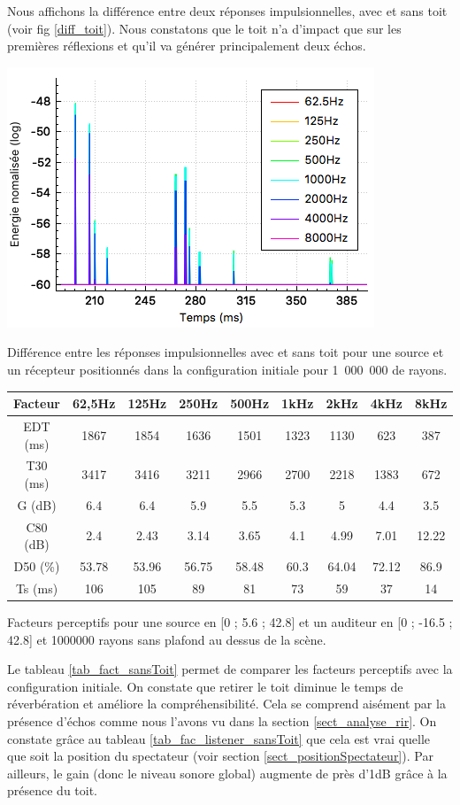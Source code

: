Nous affichons la différence entre deux réponses impulsionnelles, avec et sans toit (voir fig \ref{diff_toit}). Nous constatons que le toit n'a d'impact que sur les premières réflexions et qu'il va générer principalement deux échos.
%
\begin{figureth}
	\includegraphics[width=0.6\linewidth]{images/diff_toit}
	\caption{Différence entre les réponses impulsionnelles avec et sans toit pour une source et un récepteur positionnés dans la configuration initiale pour 1~000~000 de rayons.}
	\label{diff_toit}
\end{figureth}
%
\begin{tableth}
 \begin{tabular}{| *{9}{c|}} 
 \hline 
 Facteur & 62,5Hz & 125Hz & 250Hz & 500Hz & 1kHz & 2kHz & 4kHz & 8kHz \\ 
 \hline 
 \hline 
\gls{EDT} (ms)& 1867& 1854& 1636& 1501& 1323& 1130& 623& 387 \\ 
 \hline 
\gls{T30} (ms)& 3417& 3416& 3211& 2966& 2700& 2218& 1383& 672 \\ 
 \hline 
\gls{G} (dB)& 6.4& 6.4& 5.9& 5.5& 5.3& 5& 4.4& 3.5 \\ 
 \hline 
\gls{C80} (dB)& 2.4& 2.43& 3.14& 3.65& 4.1& 4.99& 7.01& 12.22 \\ 
 \hline 
\gls{D50} (\%)& 53.78& 53.96& 56.75& 58.48& 60.3& 64.04& 72.12& 86.9 \\ 
 \hline 
\gls{Ts} (ms)& 106& 105& 89& 81& 73& 59& 37& 14 \\ 
 \hline 
\end{tabular} 
 \caption{Facteurs perceptifs pour une source en [0 ; 5.6 ; 42.8] et un auditeur en [0 ; -16.5 ; 42.8] et 1000000 rayons sans plafond au dessus de la scène.}
 \label{tab_fact_sansToit} 
 \end{tableth}
 
 Le tableau \ref{tab_fact_sansToit} permet de comparer les facteurs perceptifs avec la configuration initiale. On constate que retirer le toit diminue le temps de réverbération et améliore la compréhensibilité. Cela se comprend aisément par la présence d'échos comme nous l'avons vu dans la section \ref{sect_analyse_rir}. On constate grâce au tableau \ref{tab_fac_listener_sansToit} que cela est vrai quelle que soit la position du spectateur (voir section \ref{sect_positionSpectateur}). Par ailleurs, le gain (donc le niveau sonore global) augmente de près d'1dB grâce à la présence du toit. 
 
